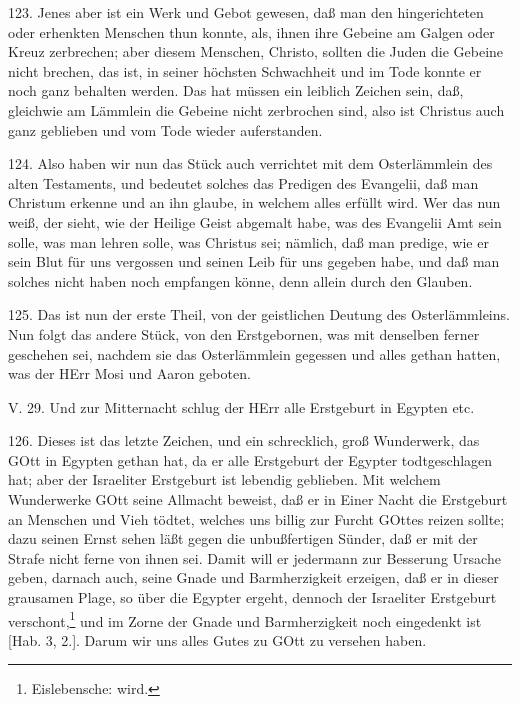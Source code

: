 123. Jenes aber ist ein Werk und Gebot gewesen, daß man den hingerichteten oder erhenkten Menschen thun konnte, als, ihnen ihre Gebeine am Galgen oder Kreuz zerbrechen; aber diesem Menschen, Christo, sollten die Juden die Gebeine nicht brechen, das ist, in seiner höchsten Schwachheit und im Tode konnte er noch ganz behalten werden. Das hat müssen ein leiblich Zeichen sein, daß, gleichwie am Lämmlein die Gebeine nicht zerbrochen sind, also ist Christus auch ganz geblieben und vom Tode wieder auferstanden.

124. Also haben wir nun das Stück auch verrichtet mit dem Osterlämmlein des alten Testaments, und bedeutet solches das Predigen des Evangelii, daß man Christum erkenne und an ihn glaube, in welchem alles erfüllt wird. Wer das nun weiß, der sieht, wie der Heilige Geist abgemalt habe, was des Evangelii Amt sein solle, was man lehren solle, was Christus sei; nämlich, daß man predige, wie er sein Blut für uns vergossen und seinen Leib für uns gegeben habe, und daß man solches nicht haben noch empfangen könne, denn allein durch den Glauben.

125. Das ist nun der erste Theil, von der geistlichen Deutung des Osterlämmleins. Nun folgt das andere Stück, von den Erstgebornen, was mit denselben ferner geschehen sei, nachdem sie das Osterlämmlein gegessen und alles gethan hatten, was der HErr Mosi und Aaron geboten.

\begin{schriftzitat}
V. 29. Und zur Mitternacht schlug der HErr alle Erstgeburt in Egypten etc.
\end{schriftzitat}

126. Dieses ist das letzte Zeichen, und ein schrecklich, groß Wunderwerk, das GOtt in Egypten gethan hat, da er alle Erstgeburt der Egypter todtgeschlagen hat; aber der Israeliter Erstgeburt ist lebendig geblieben. Mit welchem Wunderwerke GOtt seine Allmacht beweist, daß er in Einer Nacht die Erstgeburt an Menschen und Vieh tödtet, welches uns billig zur Furcht GOttes reizen sollte; dazu seinen Ernst sehen läßt gegen die unbußfertigen Sünder, daß er mit der Strafe nicht ferne von ihnen sei. Damit will er jedermann zur Besserung Ursache geben, darnach auch, seine Gnade und Barmherzigkeit erzeigen, daß er in dieser grausamen Plage, so über die Egypter ergeht, dennoch der
Israeliter Erstgeburt verschont,\footnote{Eislebensche: wird.} und im Zorne der Gnade und Barmherzigkeit noch eingedenkt ist [Hab. 3, 2.]. Darum wir uns alles Gutes zu GOtt zu versehen haben.


